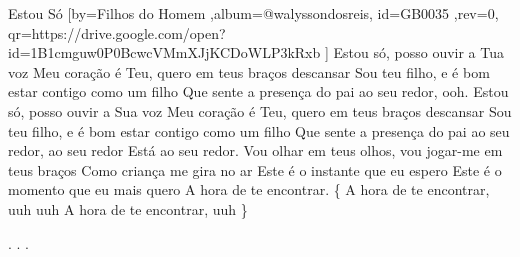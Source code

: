\beginsong
{Estou Só %
}[by={Filhos do Homem %
},album={@walyssondosreis},
id={GB0035 %
},rev={0}, %
qr={https://drive.google.com/open?id=1B1cmguw0P0BcwcVMmXJjKCDoWLP3kRxb %
}]
\beginverse*
Estou só, posso ouvir a Tua voz
Meu coração é Teu, quero em teus braços descansar
Sou teu filho, e é bom estar contigo como um filho
Que sente a presença do pai ao seu redor, ooh.
\endverse
\beginverse*
Estou só, posso ouvir a Sua voz
Meu coração é Teu, quero em teus braços descansar
Sou teu filho, e é bom estar contigo como um filho
Que sente a presença do pai ao seu redor, ao seu redor
Está ao seu redor.
\endverse
\beginchorus
Vou olhar em teus olhos, vou jogar-me em teus braços
Como criança me gira no ar
Este é o instante que eu espero
Este é o momento que eu mais quero
A hora de te encontrar.
\{ A hora de te encontrar, uuh uuh
A hora de te encontrar, uuh \}
\endchorus

\beginverse*\color{white}
.
.
.
\endverse
\begin{comment}
\lstset{basicstyle=\scriptsize\bf} %
\tab{Solo 1}
\begin{lstlisting}
E|-----------------------------------------------------|
B|-----------------------------------------------------|
G|-----------------------------------------------------|
D|-----------------------------------------------------|
A|-----------------------------------------------------|
E|-----------------------------------------------------|
\end{lstlisting}
\end{comment}
 
